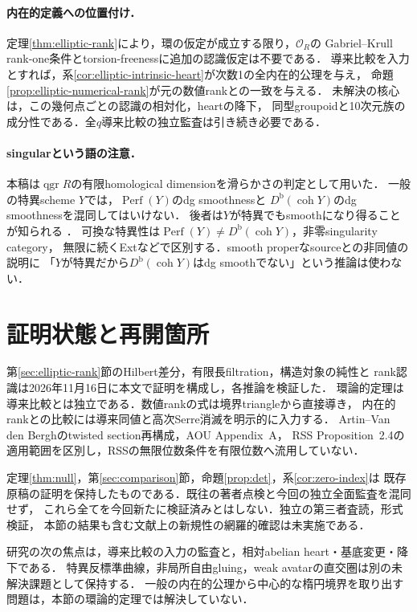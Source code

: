 \documentclass[11pt,a4paper]{ltjsarticle}
\theoremstyle{definition}
\newcommand{\OO}{\mathcal O}
\newcommand{\Db}{D^{\mathrm b}}
\newcommand{\Perf}{\operatorname{Perf}}
\newcommand{\coh}{\operatorname{coh}}
\newcommand{\qgr}{\operatorname{qgr}}
\begin{document}
\paragraph{内在的定義への位置付け．}
定理\ref{thm:elliptic-rank}により，環の仮定が成立する限り，$\OO_R$の
Gabriel--Krull rank-one条件とtorsion-freenessに追加の認識仮定は不要である．
導来比較を入力とすれば，系\ref{cor:elliptic-intrinsic-heart}が次数1の全内在的公理を与え，
命題\ref{prop:elliptic-numerical-rank}が元の数値rankとの一致を与える．
未解決の核心は，この幾何点ごとの認識の相対化，heartの降下，
同型groupoidと10次元族の成分性である．全$q$導来比較の独立監査は引き続き必要である．

\paragraph{singularという語の注意．}
本稿は$\qgr R$の有限homological dimensionを滑らかさの判定として用いた．
一般の特異scheme $Y$では，$\Perf(Y)$のdg smoothnessと
$\Db(\coh Y)$のdg smoothnessを混同してはいけない．
後者は$Y$が特異でもsmoothになり得ることが知られる
\cite[Theorem~1.2]{Efimov}．
可換な特異性は$\Perf(Y)\ne\Db(\coh Y)$，非零singularity category，
無限に続くExtなどで区別する．smooth properなsourceとの非同値の説明に
「$Y$が特異だから$\Db(\coh Y)$はdg smoothでない」という推論は使わない．

\section{証明状態と再開箇所}
第\ref{sec:elliptic-rank}節のHilbert差分，有限長filtration，構造対象の純性と
rank認識は2026年11月16日に本文で証明を構成し，各推論を検証した．
環論的定理は導来比較とは独立である．数値rankの式は境界triangleから直接導き，
内在的rankとの比較には導来同値と高次Serre消滅を明示的に入力する．
Artin--Van den Berghのtwisted section再構成，AOU Appendix~A，
RSS Proposition~2.4の適用範囲を区別し，RSSの無限位数条件を有限位数へ流用していない．

定理\ref{thm:null}，第\ref{sec:comparison}節，命題\ref{prop:det}，系\ref{cor:zero-index}は
既存原稿の証明を保持したものである．既往の著者点検と今回の独立全面監査を混同せず，
これら全てを今回新たに検証済みとはしない．独立の第三者査読，形式検証，
本節の結果も含む文献上の新規性の網羅的確認は未実施である．

研究の次の焦点は，導来比較の入力の監査と，相対abelian heart・基底変更・降下である．
特異反標準曲線，非局所自由gluing，weak avatarの直交圏は別の未解決課題として保持する．
一般の内在的公理から中心的な楕円境界を取り出す問題は，本節の環論的定理では解決していない．
\end{document}
